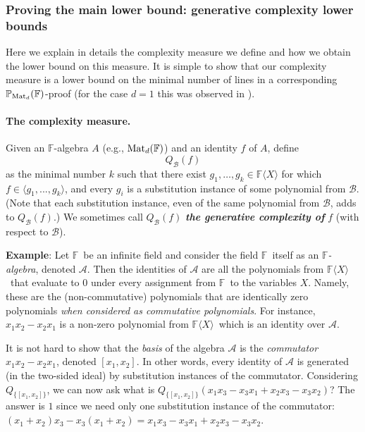 \documentclass[12pt,reqno]{article}
\newcommand\F{\ensuremath{\mathbb F}}
\newcommand\PP{{\mathbb P}}
\newcommand\PMd{\ensuremath{\PP_{{\rm Mat}_d}(\F)}}
\newcommand {\ind} {\noindent}
\newcommand {\para}[1] {\paragraph{#1}}
\newcommand{\matd}{{\ensuremath{{\rm Mat}_d(\F)}}}
\newcommand{\freea}{\ensuremath{\F\langle X\rangle}}
\begin{document}
\subsubsection{Proving the main lower bound: generative complexity lower bounds}\label{sec:ovrv:proof_of_main_lower_bound}
Here we explain in details the complexity measure we define and how we obtain the lower bound on this measure. It is simple to show that our complexity measure is a lower bound on the minimal number of lines in a corresponding \PMd-proof (for the case $d=1$ this was observed in \cite{Hru11}).
\para{The complexity measure.}




Given an \F-algebra $A$ (e.g., \matd) and an identity $f$ of $A$, define
$$Q_{\mathcal B}(f)$$  as the minimal number $k$ such that there exist $g_1,\ldots,g_k\in \freea$ for which  $f\in \langle g_1,...,g_k \rangle$, and every $g_i$ is a substitution instance of some polynomial  from $\mathcal B$. (Note that each substitution instance, even of the same polynomial from $\mathcal B $, adds to $Q_{\mathcal B}(f)$.) We sometimes call $Q_{\mathcal B}(f)$ \textit{\textbf{the generative complexity of}} $f$ (with respect to $\mathcal B$).
\bigskip

\ind \textbf{Example}: Let \F\ be an infinite field and consider the field \F\ itself as an \textit{\F-algebra}, denoted $\mathscr A$.
Then the identities of $\mathscr A$ are all the polynomials from \freea\ that evaluate to $0$ under every  assignment from \F\ to the variables \(X\). Namely, these are the (non-commutative) polynomials that are identically zero polynomials \emph{when considered as commutative polynomials}. For instance, $x_1x_2-x_2 x_1$ is a non-zero polynomial from \freea\ which is an identity over $\mathscr A$.

It is not hard to show that the \textit{basis }of the algebra $\mathscr A$ is the \textit{commutator }$x_1 x_2 -x_2 x_1$, denoted $[x_1,x_2]$. In other words, every identity of $\mathscr A$ is generated (in the two-sided ideal) by substitution instances of the commutator. Considering $Q_{\{[x_1,x_2]\}}$, we can now ask what is $Q_{\{[x_1,x_2]\}}(x_1x_3-x_3x_1+x_2x_3-x_3x_2)$? The answer is $1$ since we need only one substitution instance of the commutator: $(x_1+x_2)x_3-x_3(x_1+x_2)=x_1x_3-x_3x_1+
x_2x_3-x_3x_2$.
\bigskip
\end{document}

